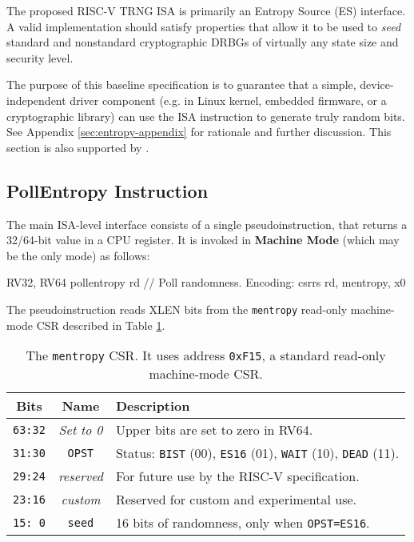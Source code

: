 \label{sec:entropy-source}

    The proposed RISC-V TRNG ISA is primarily an Entropy Source (ES)
    interface. A valid implementation should satisfy properties that allow
    it to be used to \emph{seed} standard and nonstandard cryptographic
    DRBGs of virtually any state size and security level.

    The purpose of this baseline specification is to guarantee that a simple,
    device-independent driver component (e.g. in Linux kernel, embedded
    firmware, or a cryptographic library) can use the ISA instruction to
    generate truly random bits. See Appendix \ref{sec:entropy-appendix} for
    rationale and further discussion. This section is also supported by
    \cite{SaNeMa20}.

\subsection{PollEntropy Instruction}
\label{sec:es-pollentropy}

    The main ISA-level interface consists of a single pseudoinstruction,
     that returns a 32/64-bit value in a CPU register.
    It is invoked in {\bf Machine Mode} (which may be the only mode) as
    follows:

\begin{cryptoisa}
RV32, RV64
    pollentropy    rd   // Poll randomness. Encoding: csrrs rd, mentropy, x0
\end{cryptoisa}
    The  pseudoinstruction reads XLEN bits from the
    {\tt mentropy} read-only machine-mode CSR
    described in Table \ref{tab:mentropy}.

    \begin{table}[h!]
    \begin{center}
    \begin{tabular}{ccl}
    \toprule
    Bits    & Name  & Description \\
    \midrule
    \verb|63:32|    & {\it Set to 0}
            & Upper bits are set to zero in RV64. \\
    \verb|31:30|    & \verb|OPST|
            & Status:   \verb|BIST| (00), \verb|ES16| (01),
                        \verb|WAIT| (10),   \verb|DEAD| (11). \\
    \verb|29:24|    & {\it reserved}
            & For future use by the RISC-V specification. \\
    \verb|23:16|    & {\it custom}
            & Reserved for custom and experimental use. \\
    \verb|15: 0|    & \verb|seed|
            & 16 bits of randomness, only when \verb|OPST=ES16|.    \\
    \bottomrule
    \end{tabular}
    \caption{
        The {\tt mentropy} CSR.
        It uses address {\tt 0xF15}, a standard read-only machine-mode CSR.
    }
    \label{tab:mentropy}
    \end{center}
    \end{table}

